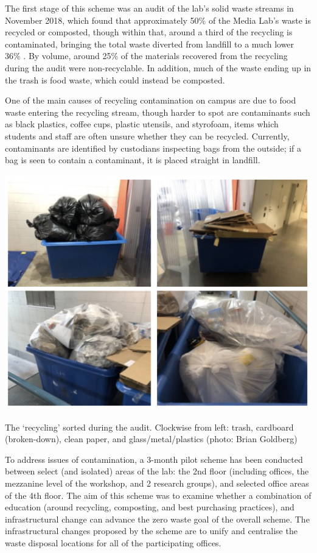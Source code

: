 \documentclass[nofonts,nols,justified,nobib]{tufte-book}
\begin{document}
The first stage of this scheme was an audit of the lab's solid waste streams in November 2018, which found that approximately 50\% of the Media Lab's waste is recycled or composted, though within that, around a third of the recycling is contaminated, bringing the total waste diverted from landfill to a much lower 36\% \cite{enevo_MIT_2018}. By volume, around 25\% of the materials recovered from the recycling during the audit were non-recyclable. In addition, much of the waste ending up in the trash is food waste, which could instead be composted.

One of the main causes of recycling contamination on campus are due to food waste entering the recycling stream, though harder to spot are contaminants such as black plastics, coffee cups, plastic utensils, and styrofoam, items which students and staff are often unsure whether they can be recycled. Currently, contaminants are identified by custodians inspecting bags from the outside; if a bag is seen to contain a contaminant, it is placed straight in landfill.

\begin{marginfigure}
\includegraphics[width=\textwidth]{img/2/post-audit.png}
\caption{The `recycling' sorted during the audit. Clockwise from left: trash, cardboard (broken-down), clean paper, and glass/metal/plastics (photo: Brian Goldberg)}
\end{marginfigure}

To address issues of contamination, a 3-month pilot scheme has been conducted between select (and isolated) areas of the lab: the 2nd floor (including offices, the mezzanine level of the workshop, and 2 research groups), and selected office areas of the 4th floor. The aim of this scheme was to examine whether a combination of education (around recycling, composting, and best purchasing practices), and infrastructural change can advance the zero waste goal of the overall scheme. The infrastructural changes proposed by the scheme are to unify and centralise the waste disposal locations for all of the participating offices. 
\end{document}

